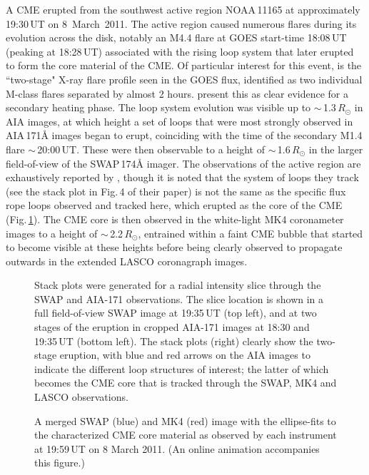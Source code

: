 \documentclass[namedreferences]{solarphysics}
\begin{document}
\begin{article}
A CME erupted from the southwest active region NOAA\,11165 at approximately 19:30\,UT on 8~March~2011. The active region caused numerous flares during its evolution across the disk, notably an M4.4 flare at GOES start-time 18:08\,UT (peaking at 18:28\,UT) associated with the rising loop system that later erupted to form the core material of the CME. Of particular interest for this event, is the ``two-stage" X-ray flare profile seen in the GOES flux, identified as two individual M-class flares separated by almost 2 hours.  present this as clear evidence for a secondary heating phase. The loop system evolution was visible up to $\sim$\,1.3\,$R_{\odot}$ in AIA images, at which height a set of loops that were most strongly observed in AIA\,171{\AA} images began to erupt, coinciding with the time of the secondary M1.4 flare $\sim$\,20:00\,UT. These were then observable to a height of $\sim$\,1.6\,$R_{\odot}$ in the larger field-of-view of the SWAP\,174{\AA} imager. The observations of the active region are exhaustively reported by , though it is noted that the system of loops they track (see the stack plot in Fig.\,4 of their paper) is not the same as the specific flux rope loops observed and tracked here, which erupted as the core of the CME (Fig.\,\ref{stackplots}). The CME core is then observed in the white-light MK4 coronameter images to a height of $\sim$\,2.2\,$R_{\odot}$, entrained within a faint CME bubble that started to become visible at these heights before being clearly observed to propagate outwards in the extended LASCO coronagraph images.  %

\begin{figure}[t]
\caption{Stack plots were generated for a radial intensity slice through the SWAP and AIA-171 observations. The slice location is shown in a full field-of-view SWAP image at 19:35\,UT (top left), and at two stages of the eruption in cropped AIA-171 images at 18:30 and 19:35\,UT (bottom left). The stack plots (right) clearly show the two-stage eruption, with blue and red arrows on the AIA images to indicate the different loop structures of interest; the latter of which becomes the CME core that is tracked through the SWAP, MK4 and LASCO observations.}
\label{stackplots}
\end{figure}

\begin{figure}[t]
\caption{A merged SWAP (blue) and MK4 (red) image with the ellipse-fits to the characterized CME core material as observed by each instrument at 19:59\,UT on 8 March 2011. (An online animation accompanies this figure.)}
\label{combined}
\end{figure}


\end{article}
\end{document}
